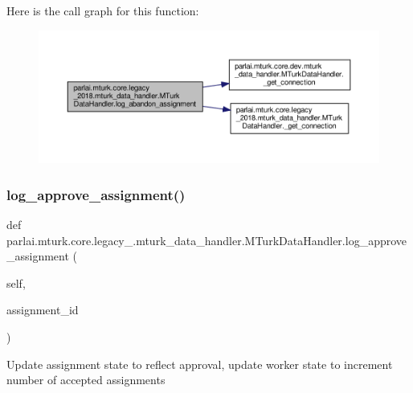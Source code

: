 Here is the call graph for this function\+:
\nopagebreak
\begin{figure}[H]
\begin{center}
\leavevmode
\includegraphics[width=350pt]{classparlai_1_1mturk_1_1core_1_1legacy__2018_1_1mturk__data__handler_1_1MTurkDataHandler_a6c4a99613bcdcf61126d251f7c5d0f29_cgraph}
\end{center}
\end{figure}
\mbox{\label{classparlai_1_1mturk_1_1core_1_1legacy__2018_1_1mturk__data__handler_1_1MTurkDataHandler_ae56cf103d88b3fda36a51ffc0534c184}} 
\subsubsection{\texorpdfstring{log\+\_\+approve\+\_\+assignment()}{log\_approve\_assignment()}}
{\footnotesize\ttfamily def parlai.\+mturk.\+core.\+legacy\+\_.\+mturk\+\_\+data\+\_\+handler.\+M\+Turk\+Data\+Handler.\+log\+\_\+approve\+\_\+assignment (\begin{DoxyParamCaption}\item[{}]{self,  }\item[{}]{assignment\+\_\+id }\end{DoxyParamCaption})}

\begin{DoxyVerb}Update assignment state to reflect approval, update worker state to
increment number of accepted assignments
\end{DoxyVerb}
 

